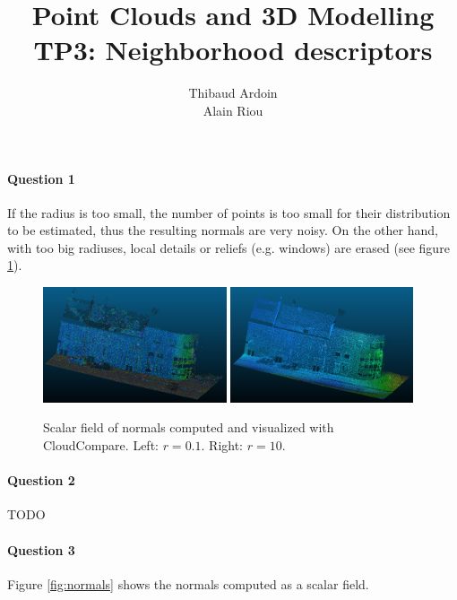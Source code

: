 \documentclass[10pt,a4paper]{article}
\title{\textbf{Point Clouds and 3D Modelling}\\TP3: Neighborhood descriptors}
\author{Thibaud Ardoin\\Alain Riou}
\begin{document}
\maketitle

\paragraph{Question 1} %

If the radius is too small, the number of points is too small for their distribution to be estimated, thus the resulting normals are very noisy. On the other hand, with too big radiuses, local details or reliefs (e.g. windows) are erased (see figure \ref{fig:radius}).

\begin{figure}[h!]
	\centering
	\includegraphics[width=0.483\textwidth]{small_radius.png}
	\includegraphics[width=0.48\textwidth]{huge_radius.png}
	\caption{Scalar field of normals computed and visualized with CloudCompare. Left: $r = 0.1$. Right: $r = 10$.}
	\label{fig:radius}
\end{figure}

\paragraph{Question 2}

TODO

\paragraph{Question 3} %

Figure \ref{fig:normals} shows the normals computed as a scalar field.
\end{document}

